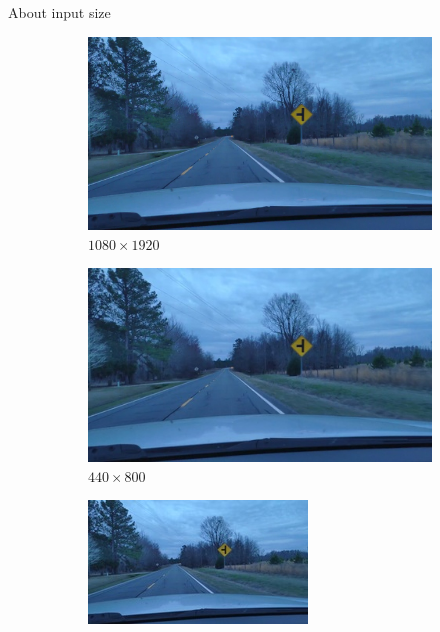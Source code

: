 \documentclass{beamer}
\begin{document}
\begin{frame}{About input size}
    \begin{figure}
  \begin{center}
    \begin{subfigure}[t]{.4\linewidth}
      \centering
      \includegraphics[width=0.99\linewidth]{figures/im_example_full.jpg}
      \caption{$1080\times1920$}
    \end{subfigure}
    \begin{subfigure}[t]{.4\linewidth}
      \centering
      \includegraphics[width=0.99\linewidth]{figures/im_example_440x800.jpg}
      \caption{$440\times800$}
    \end{subfigure}
    \begin{subfigure}[t]{.4\linewidth}
      \centering
      \includegraphics[width=0.99\linewidth]{figures/im_example_220x400.jpg}

\end{subfigure}
\end{center}
\end{figure}
\end{frame}
\end{document}
